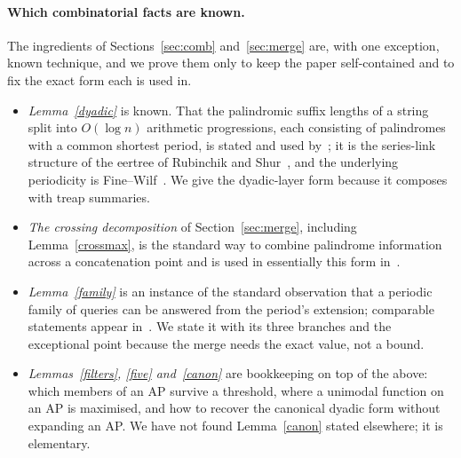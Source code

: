 ﻿\documentclass[11pt]{article}
\theoremstyle{plain}
\theoremstyle{remark}
\begin{document}
\paragraph{Which combinatorial facts are known.} The ingredients of Sections~\ref{sec:comb} and~\ref{sec:merge} are, with one exception, known technique, and we prove them only to keep the paper self-contained and to fix the exact form each is used in.
\begin{itemize}
\item \emph{Lemma~\ref{dyadic}} is known. That the palindromic suffix lengths of a string split into $O(\log n)$ arithmetic progressions, each consisting of palindromes with a common shortest period, is stated and used by~\cite[\S8.2]{ACPR18}; it is the series-link structure of the eertree of Rubinchik and Shur~\cite{RS15}, and the underlying periodicity is Fine--Wilf~\cite{FW}. We give the dyadic-layer form because it composes with treap summaries.
\item \emph{The crossing decomposition} of Section~\ref{sec:merge}, including Lemma~\ref{crossmax}, is the standard way to combine palindrome information across a concatenation point and is used in essentially this form in~\cite{AB19,ACPR18}.
\item \emph{Lemma~\ref{family}} is an instance of the standard observation that a periodic family of queries can be answered from the period's extension; comparable statements appear in~\cite{AB19,ACPR18}. We state it with its three branches and the exceptional point because the merge needs the exact value, not a bound.
\item \emph{Lemmas~\ref{filters}, \ref{five} and~\ref{canon}} are bookkeeping on top of the above: which members of an AP survive a threshold, where a unimodal function on an AP is maximised, and how to recover the canonical dyadic form without expanding an AP. We have not found Lemma~\ref{canon} stated elsewhere; it is elementary.
\end{itemize}
\end{document}
